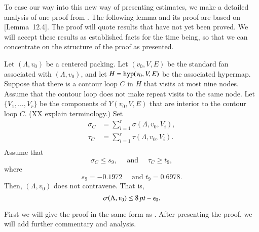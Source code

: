 To ease our way into this new way of presenting estimates, 
we make a detailed analysis of
one proof from \cite{DCG}.  The following lemma and its proof are
based on \cite{DCG}[Lemma~12.4].  The proof will quote results that
have not yet been proved.  We will accept these results 
as established facts for the time being, 
so that we can concentrate on the structure
of the proof as presented.


\begin{lemma}\label{lemma:nonagon}  
Let $(\Lambda,v_0)$ be a centered packing.
Let $(v_0,V,E)$ be the standard fan associated with $(\Lambda,v_0)$,
and let $H={\operatorname{hyp}}(v_0,V,E)$ be the associated hypermap.  
Suppose that there is a contour loop $C$ in $H$ that visits
at most nine nodes.  Assume that the contour loop does not make
repeat visits to the same node.
Let $\{V_1,\ldots,V_r\}$ be the components of $Y(v_0,V,E)$ that
are interior to the contour loop $C$.  (XX explain terminology.)
Set 
   $$
   \begin{array}{lll}
   \sigma_C &= \sum_{i=1}^r \sigma(\Lambda,v_0,V_i),\\
   \tau_C &= \sum_{i=1}^r \tau(\Lambda,v_0,V_i).\\
   \end{array}
   $$
Assume that
    $$
    \sigma_C \le s_9,\quad \text{ and } \quad \tau_C \ge t_9,
    $$
where 
    $$
    s_9 = -0.1972 \quad \text{ and } t_9 = 0.6978.
    $$
Then, $(\Lambda,v_0)$ does not contravene.  That is,
$$
\sigma(\Lambda,v_0) \le 8\,\hbox{\it pt} - \epsilon_0.
$$
\end{lemma}

First we will give the proof in the same form as \cite{DCG}.
After presenting the proof, we will add further commentary and analysis.


